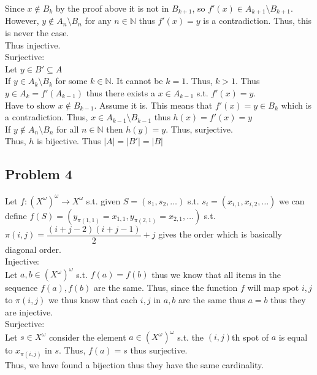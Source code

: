 \documentclass[12pt, letterpaper]{article}
\theoremstyle{definition}
\newcommand{\N}{\mathbb{N}}
\begin{document}
Since $x \notin B_k$ by the proof above it is not in $B_{k+1}$, so $f'(x) \in A_{k+1} \setminus B_{k+1}$. However, $y \notin A_n \setminus B_n$ for any $n \in \N$ thus $f'(x) = y$ is a contradiction. Thus, this is never the case.\\
Thus injective.\\
Surjective:\\
Let $y \in B' \subseteq A$\\
If $y \in A_k \setminus B_k$ for some $k \in \N$. It cannot be $k=1$. Thus, $k >1$. Thus $y \in A_k = f'(A_{k-1})$ thus there exists a $x \in A_{k-1}$ s.t. $f'(x)=y$.\\
Have to show $x \notin B_{k-1}$. Assume it is. This means that $f'(x)=y \in B_k$ which is a contradiction. Thus, $x \in A_{k-1} \setminus B_{k-1}$ thus $h(x)=f'(x)=y$\\
If $y \notin A_n \setminus B_n$ for all $n \in \N$ then $h(y)=y$. Thus, surjective.\\
Thus, $h$ is bijective. Thus $|A|=|B'|=|B|$

\newpage
\subsection*{Problem 4}
Let $f : (X^\omega)^\omega \to X^\omega$ s.t. given $S=(s_1,s_2,\dots)$ s.t. $s_i=(x_{i,1},x_{i,2},\dots)$ we can define $f(S)=(y_{\pi(1,1)}=x_{1,1},y_{\pi(2,1)}=x_{2,1},\dots)$ s.t. $\pi(i,j)=\dfrac{(i+j-2)(i+j-1)}{2}+j$ gives the order which is basically diagonal order.\\
Injective:\\
Let $a,b \in (X^\omega)^\omega$ s.t. $f(a)=f(b)$ thus we know that all items in the sequence $f(a),f(b)$ are the same. Thus, since the function $f$ will map spot $i,j$ to $\pi(i,j)$ we thus know that each $i,j$ in $a,b$ are the same thus $a=b$ thus they are injective.\\
Surjective:\\
Let $s \in X^\omega$ consider the element $a \in (X^\omega)^\omega$ s.t. the $(i,j)$th spot of $a$ is equal to $x_{\pi(i,j)}$ in $s$. Thus, $f(a)=s$ thus surjective.\\
Thus, we have found a bijection thus they have the same cardinality.

\newpage
\end{document}
